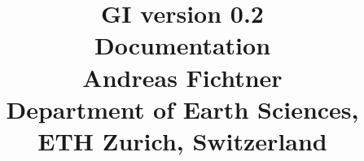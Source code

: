\documentclass[graybox,envcountchap,sectrefs]{svmono}
\begin{document}
\title{ 	\Huge{\textbf{GI} version 0.2}\\[10pt] 
	\large{Documentation}\\[100pt]
	\LARGE{Andreas Fichtner}\\[5pt] 
	\normalsize{Department of Earth Sciences, ETH Zurich, Switzerland}\\[15pt]
	\normalsize{} }

\maketitle

\frontmatter%

\tableofcontents



\mainmatter%



  



\end{document}

